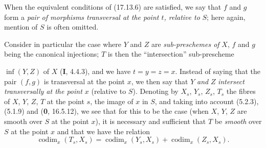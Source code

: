 When the equivalent conditions of (17.13.6) are satisfied, we say that $f$ and $g$ form a \emph{pair of morphisms transversal at the point $t$, relative to} $S$; here again, mention of $S$ is often omitted.

\begin{env}[17.13.7]\label{IV.17.13.7}
Consider in particular the case where $Y$ and $Z$ are \emph{sub-preschemes of} $X$, $f$ and $g$ being the canonical injections; $T$ is then the ``intersection'' sub-prescheme


$\inf(Y,Z)$ of $X$ (\textbf{I}, 4.4.3), and we have $t=y=z=x$. Instead of saying that the pair $(f,g)$ is transversal at the point $x$, we then say that $Y$ \emph{and} $Z$ \emph{intersect transversally at the point $x$} (relative to $S$). Denoting by $X_s$, $Y_s$, $Z_s$, $T_s$ the fibres of $X$, $Y$, $Z$, $T$ at the point $s$, the image of $x$ in $S$, and taking into account (5.2.3), (5.1.9) and (\textbf{0}, 16.5.12), we see that for this to be the case (when $X$, $Y$, $Z$ are smooth over $S$ at the point $x$), it is necessary and sufficient that $T$ be \emph{smooth} over $S$ at the point $x$ and that we have the relation
\[
\label{IV.17.13.7.1}
\tag{17.13.7.1}
\operatorname{codim}_x(T_s,X_s)=\operatorname{codim}_x(Y_s,X_s)+\operatorname{codim}_x(Z_s,X_s).
\]
\end{env}

